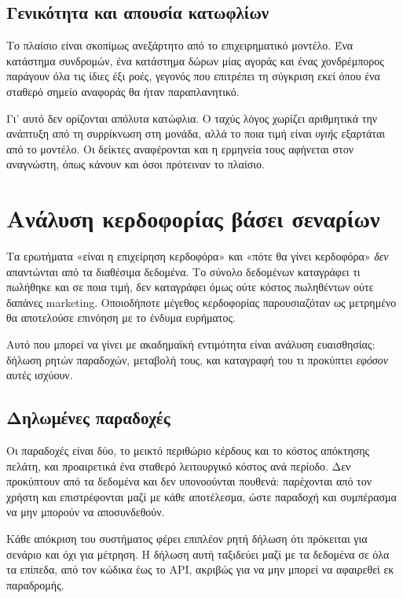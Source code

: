 \subsection{Γενικότητα και απουσία κατωφλίων}

Το πλαίσιο είναι σκοπίμως ανεξάρτητο από το επιχειρηματικό μοντέλο. Ένα
κατάστημα συνδρομών, ένα κατάστημα δώρων μίας αγοράς και ένας χονδρέμπορος
παράγουν όλα τις ίδιες έξι ροές, γεγονός που επιτρέπει τη σύγκριση εκεί όπου
ένα σταθερό σημείο αναφοράς θα ήταν παραπλανητικό.

Γι' αυτό δεν ορίζονται απόλυτα κατώφλια. Ο ταχύς λόγος χωρίζει αριθμητικά την
ανάπτυξη από τη συρρίκνωση στη μονάδα, αλλά το ποια τιμή είναι \emph{υγιής}
εξαρτάται από το μοντέλο. Οι δείκτες αναφέρονται και η ερμηνεία τους αφήνεται
στον αναγνώστη, όπως κάνουν και όσοι πρότειναν το πλαίσιο.

\section{Ανάλυση κερδοφορίας βάσει σεναρίων}
\label{sec:profitability-scenarios}

Τα ερωτήματα «είναι η επιχείρηση κερδοφόρα» και «πότε θα γίνει κερδοφόρα»
\emph{δεν} απαντώνται από τα διαθέσιμα δεδομένα. Το σύνολο δεδομένων καταγράφει
τι πωλήθηκε και σε ποια τιμή, δεν καταγράφει όμως ούτε κόστος πωληθέντων ούτε
δαπάνες marketing. Οποιοδήποτε μέγεθος κερδοφορίας παρουσιαζόταν ως μετρημένο
θα αποτελούσε επινόηση με το ένδυμα ευρήματος.

Αυτό που μπορεί να γίνει με ακαδημαϊκή εντιμότητα είναι ανάλυση ευαισθησίας:
δήλωση ρητών παραδοχών, μεταβολή τους, και καταγραφή του τι προκύπτει
\emph{εφόσον} αυτές ισχύουν.

\subsection{Δηλωμένες παραδοχές}

Οι παραδοχές είναι δύο, το μεικτό περιθώριο κέρδους και το κόστος απόκτησης
πελάτη, και προαιρετικά ένα σταθερό λειτουργικό κόστος ανά περίοδο. Δεν
προκύπτουν από τα δεδομένα και δεν υπονοούνται πουθενά: παρέχονται από τον
χρήστη και επιστρέφονται μαζί με κάθε αποτέλεσμα, ώστε παραδοχή και συμπέρασμα
να μην μπορούν να αποσυνδεθούν.

Κάθε απόκριση του συστήματος φέρει επιπλέον ρητή δήλωση ότι πρόκειται για
σενάριο και όχι για μέτρηση. Η δήλωση αυτή ταξιδεύει μαζί με τα δεδομένα σε
όλα τα επίπεδα, από τον κώδικα έως το API, ακριβώς για να μην μπορεί να
αφαιρεθεί εκ παραδρομής.

